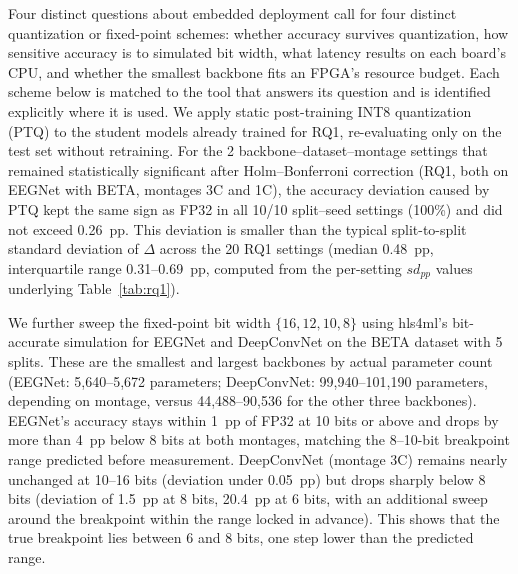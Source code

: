 \documentclass[11pt,a4paper,twoside,asymmetric]{article}
\begin{document}
Four distinct questions about embedded deployment call for four distinct quantization or fixed-point schemes: whether accuracy survives quantization, how sensitive accuracy is to simulated bit width, what latency results on each board's CPU, and whether the smallest backbone fits an FPGA's resource budget. Each scheme below is matched to the tool that answers its question and is identified explicitly where it is used. We apply static post-training INT8 quantization (PTQ) to the student models already trained for RQ1, re-evaluating only on the test set without retraining. For the 2 backbone--dataset--montage settings that remained statistically significant after Holm--Bonferroni correction (RQ1, both on EEGNet with BETA, montages 3C and 1C), the accuracy deviation caused by PTQ kept the same sign as FP32 in all 10/10 split--seed settings (100\%) and did not exceed 0.26~pp. This deviation is smaller than the typical split-to-split standard deviation of $\Delta$ across the 20 RQ1 settings (median 0.48~pp, interquartile range 0.31--0.69~pp, computed from the per-setting $sd_{pp}$ values underlying Table~\ref{tab:rq1}).

We further sweep the fixed-point bit width $\{16,12,10,8\}$ using hls4ml's bit-accurate simulation for EEGNet and DeepConvNet on the BETA dataset with 5 splits. These are the smallest and largest backbones by actual parameter count (EEGNet: 5{,}640--5{,}672 parameters; DeepConvNet: 99{,}940--101{,}190 parameters, depending on montage, versus 44{,}488--90{,}536 for the other three backbones). EEGNet's accuracy stays within 1~pp of FP32 at 10 bits or above and drops by more than 4~pp below 8 bits at both montages, matching the 8--10-bit breakpoint range predicted before measurement. DeepConvNet (montage 3C) remains nearly unchanged at 10--16 bits (deviation under 0.05~pp) but drops sharply below 8 bits (deviation of 1.5~pp at 8 bits, 20.4~pp at 6 bits, with an additional sweep around the breakpoint within the range locked in advance). This shows that the true breakpoint lies between 6 and 8 bits, one step lower than the predicted range.
\end{document}

